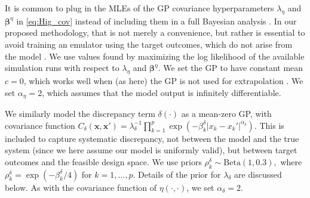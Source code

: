 \documentclass[12pt]{article}
\begin{document}
%
It is common to plug in the MLEs of the GP covariance hyperparameters $\lambda_\eta$ and $\boldsymbol \beta^\eta$ in \eqref{eq:Hig_cov} instead of including them in a full Bayesian analysis \citep{Kennedy2001,Santner2003a,Qian2008,Paulo2012}.
%
In our proposed methodology, that is not merely a convenience, but rather is essential 
%
%
%
%
to avoid training an emulator using the target outcomes, which do not arise from the model \citep[see][on the dangers that arise here]{Liu2009}.
%
We use values found by maximizing the log likelihood of the available simulation runs with respect to $\lambda_\eta$ and $\boldsymbol\beta^\eta$.
%
We set the GP to have constant mean $c=0$, which works well when (as here) the GP is not used for extrapolation \citep{Bayarri2007}.
%
We set $\alpha_\eta = 2$, which assumes that the model output is infinitely differentiable.
%

%
We similarly model the discrepancy term $\delta(\cdot)$ as a mean-zero GP, with covariance function
%
$C_\delta(\mathbf x,\mathbf x') = \lambda_\delta^{-1} \prod_{k=1}^p
\exp\left( -\beta_k^\delta |x_k-x_k'|^{\alpha_\delta} \right).$
%
This is included to capture systematic discrepancy, not between the model and the true system (since we here assume our model is uniformly valid), but between target outcomes and the feasible design space.
%
We use priors
$\rho^\delta_k \sim \mathrm{Beta}(1,0.3),$
where $\rho_k^\delta = \exp(-\beta_k^\delta/4)$ for $k=1,\ldots,p$. 
%
%
%
Details of the prior for $\lambda_\delta$ are discussed below.
%
As with the covariance function of $\eta(\cdot,\cdot)$, we set $\alpha_\delta=2$.
%
\end{document}
